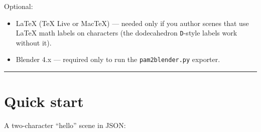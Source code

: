 \documentclass[
  11pt,
]{book}
\providecommand{\tightlist}{%
  \setlength{\itemsep}{0pt}\setlength{\parskip}{0pt}}
\begin{document}
Optional:

\begin{itemize}
\tightlist
\item
  LaTeX (TeX Live or MacTeX) --- needed only if you author scenes that
  use LaTeX math labels on characters (the dodecahedron \texttt{D}-style
  labels work without it).
\item
  Blender 4.x --- required only to run the \texttt{pam2blender.py}
  exporter.
\end{itemize}

\begin{center}\rule{0.5\linewidth}{0.5pt}\end{center}

\section{Quick start}\label{quick-start}

A two-character ``hello'' scene in JSON:
\end{document}
